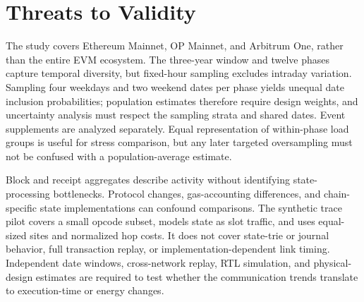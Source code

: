 \documentclass[runningheads]{llncs}
\begin{document}
\section{Threats to Validity}
The study covers Ethereum Mainnet, OP Mainnet, and Arbitrum One, rather than the entire EVM ecosystem. The three-year window and twelve phases capture temporal diversity, but fixed-hour sampling excludes intraday variation. Sampling four weekdays and two weekend dates per phase yields unequal date inclusion probabilities; population estimates therefore require design weights, and uncertainty analysis must respect the sampling strata and shared dates. Event supplements are analyzed separately. Equal representation of within-phase load groups is useful for stress comparison, but any later targeted oversampling must not be confused with a population-average estimate.

Block and receipt aggregates describe activity without identifying state-processing bottlenecks. Protocol changes, gas-accounting differences, and chain-specific state implementations can confound comparisons. The synthetic trace pilot covers a small opcode subset, models state as slot traffic, and uses equal-sized sites and normalized hop costs. It does not cover state-trie or journal behavior, full transaction replay, or implementation-dependent link timing. Independent date windows, cross-network replay, RTL simulation, and physical-design estimates are required to test whether the communication trends translate to execution-time or energy changes.
\end{document}
